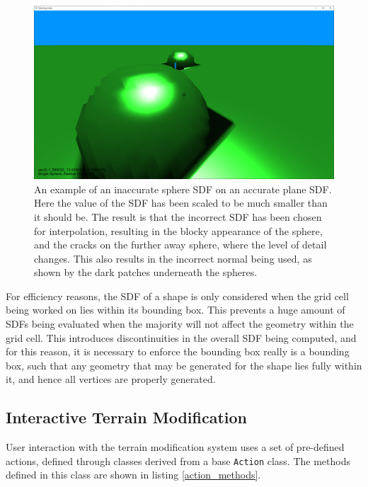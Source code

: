 \documentclass{article}
\begin{document}
\begin{figure}[H]
  \includegraphics[width=\textwidth]{inaccurate_sdf.png}
  \caption{An example of an inaccurate sphere SDF on an accurate plane SDF. Here the value of the SDF has been scaled to be much smaller than it should be. The result is that the incorrect SDF has been chosen for interpolation, resulting in the blocky appearance of the sphere, and the cracks on the further away sphere, where the level of detail changes. This also results in the incorrect normal being used, as shown by the dark patches underneath the spheres.}
  \label{fig:inaccurate_sdf}
\end{figure}

For efficiency reasons, the SDF of a shape is only considered when the grid cell being worked on lies within its bounding box. This prevents a huge amount of SDFs being evaluated when the majority will not affect the geometry within the grid cell. This introduces discontinuities in the overall SDF being computed, and for this reason, it is necessary to enforce the bounding box really is a bounding box, such that any geometry that may be generated for the shape lies fully within it, and hence all vertices are properly generated. 

\subsection{Interactive Terrain Modification}
User interaction with the terrain modification system uses a set of pre-defined actions, defined through classes derived from a base \texttt{Action} class. The methods defined in this class are shown in listing \ref{action_methods}.
\end{document}
